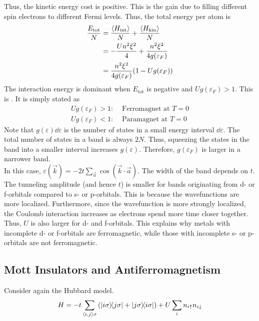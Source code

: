 \documentclass[12pt,a4paper,titlepage]{article}
\newcommand{\trm}[1]{\textrm{#1}} %
\newcommand{\up}{\uparrow} %
\newcommand{\dn}{\downarrow} %
\newcommand{\ul}[1]{\underline{\smash{#1}}} %
\begin{document}
Thus, the kinetic energy cost is positive. This is the gain due to filling different spin electrons to different Fermi levels. Thus, the total energy per atom is
\begin{equation}
\begin{aligned}
\frac{E_{\trm{tot}}}{N}&=\frac{\expval{H_{\trm{int}}}}{N}+\frac{\expval{H_{\trm{kin}}}}{N}\\
&=-\frac{Un^{2}\xi^{2}}{4}+\frac{n^{2}\xi^{2}}{4g(\varepsilon_{F})}\\
&=\frac{n^{2}\xi^{2}}{4g(\varepsilon_{F})}(1-Ug(\varepsilon_{F}))
\end{aligned}
\end{equation}
The interaction energy is dominant when $E_{\trm{tot}}$ is negative and $Ug(\varepsilon_{F})>1$. This is \ul{Stoner's criteria}. It is simply stated as
\begin{equation}
\begin{aligned}
Ug(\varepsilon_{F})>1:&\trm{ Ferromagnet at }T=0\\
Ug(\varepsilon_{F})<1:&\trm{ Paramagnet at }T=0
\end{aligned}
\end{equation}
Note that $g(\varepsilon)\dd{\varepsilon}$ is the number of states in a small energy interval $\dd{\varepsilon}$. The total number of states in a band is always $2N$. Thus, squeezing the states in the band into a smaller interval increases $g(\varepsilon)$. Therefore, $g(\varepsilon_{F})$ is larger in a narrower band.\\

In this case, $\varepsilon(\vec{k})=-2t\sum_{\vec{a}}\cos(\vec{k}\cdot\vec{a})$. The width of the band depends on $t$. The tunneling amplitude (and hence $t$) is smaller for bands originating from d- or f-orbitals compared to s- or p-orbitals. This is because the wavefunctions are more localized. Furthermore, since the wavefunction is more strongly localized, the Coulomb interaction increases as electrons spend more time closer together. Thus, $U$ is also larger for d- and f-orbitals. This explains why metals with incomplete d- or f-orbitals are ferromagnetic, while those with incomplete s- or p-orbitals are not ferromagnetic.

\subsection{Mott Insulators and Antiferromagnetism}
Consider again the Hubbard model.
\begin{equation}
H=-t\sum_{\langle i,j\rangle\sigma}\left(\ketbra{i\sigma}{j\sigma}+\ketbra{j\sigma}{i\sigma}\right)+U\sum_{i}n_{i\up}n_{i\dn}
\end{equation}
\end{document}
